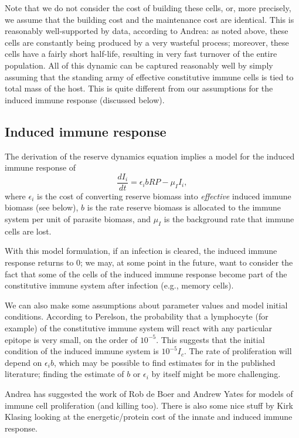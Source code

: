 \documentclass[12pt,reqno,final,pdftex]{amsart}\usepackage[]{graphicx}\usepackage[]{color}
\theoremstyle{plain}
\numberwithin{equation}{part}
\begin{document}
Note that we do not consider the cost of building these cells, or, more precisely, we assume that the building cost and the maintenance cost are identical.
This is reasonably well-supported by data, according to Andrea: as noted above, these cells are constantly being produced by a very wasteful process; moreover, these cells have a fairly short half-life, resulting in very fast turnover of the entire population.
All of this dynamic can be captured reasonably well by simply assuming that the standing army of effective constitutive immune cells is tied to total mass of the host.
This is quite different from our assumptions for the induced immune response (discussed below).

\subsection*{ Induced immune response}
The derivation of the reserve dynamics equation implies a model for the induced immune response of
\begin{equation}
\frac{dI_i}{dt}=\epsilon _ib R P-\mu _II_i,
\end{equation}
where $\epsilon _i$ is the cost of converting reserve biomass into \textit{effective} induced immune biomass (see below), $b$ is the rate reserve biomass is allocated to the immune system per unit of parasite biomass, and $\mu _I$ is the background rate that immune cells are lost.

With this model formulation, if an infection is cleared, the induced immune response returns to 0; we may, at some point in the future, want to consider the fact that some of the cells of the induced immune response become part of the constitutive immune system after infection (e.g., memory cells).

We can also make some assumptions about parameter values and model initial conditions.
According to Perelson, the probability that a lymphocyte (for example) of the constitutive immune system will react with any particular epitope is very small, on the order of $10^{-5}$.
This suggests that the initial condition of the induced immune system is $10^{-5}I_c$.
The rate of proliferation will depend on $\epsilon_i b$, which may be possible to find estimates for in the published literature; finding the estimate of $b$ or $\epsilon_i$ by itself might be more challenging.

Andrea has suggested the work of Rob de Boer and Andrew Yates for models of immune cell proliferation (and killing too).
There is also some nice stuff by Kirk Klasing looking at the energetic/protein cost of the innate and induced immune response.
\end{document}

